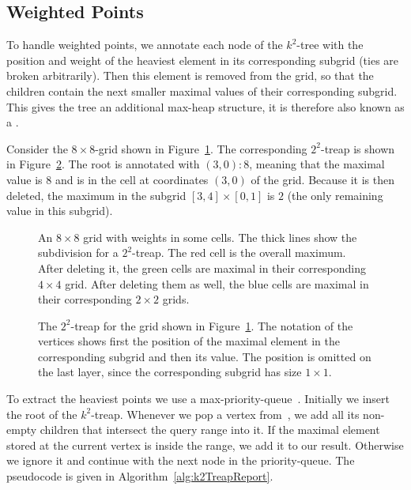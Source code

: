 \subsection{Weighted Points}
To handle weighted points, we annotate each node of the $k^2$-tree with the position and weight of the heaviest element in its corresponding subgrid (ties are broken arbitrarily). Then this element is removed from the grid, so that the children contain the next smaller maximal values of their corresponding subgrid. This gives the tree an additional max-heap structure, it is therefore also known as a .

\begin{Example}
  Consider the $8 \times 8$-grid shown in Figure~\ref{fig:k2TreapGrid}. The corresponding $2^2$-treap is shown in Figure~\ref{fig:k2Treap}. The root is annotated with $(3, 0) : 8$, meaning that the maximal value is $8$ and is in the cell at coordinates $(3, 0)$ of the grid. Because it is then deleted, the maximum in the subgrid $[3, 4] \times [0, 1]$ is $2$ (the only remaining value in this subgrid).

  \begin{figure}[htb]
    \centering
    
    \caption{An $8 \times 8$ grid with weights in some cells. The thick lines show the subdivision for a $2^2$-treap. The red cell is the overall maximum. After deleting it, the green cells are maximal in their corresponding $4 \times 4$ grid. After deleting them as well, the blue cells are maximal in their corresponding $2 \times 2$ grids.}
    \label{fig:k2TreapGrid}
  \end{figure}


  \begin{figure}[htb]
    \centering
    
    \caption{The $2^2$-treap for the grid shown in Figure~\ref{fig:k2TreapGrid}. The notation of the vertices shows first the position of the maximal element in the corresponding subgrid and then its value. The position is omitted on the last layer, since the corresponding subgrid has size $1 \times 1$.}
    \label{fig:k2Treap}
  \end{figure}
\end{Example}

To extract the heaviest points we use a max-priority-queue~. Initially we insert the root of the $k^2$-treap. Whenever we pop a vertex from~, we add all its non-empty children that intersect the query range into it. If the maximal element stored at the current vertex is inside the range, we add it to our result. Otherwise we ignore it and continue with the next node in the priority-queue. The pseudocode is given in Algorithm~\ref{alg:k2TreapReport}.

